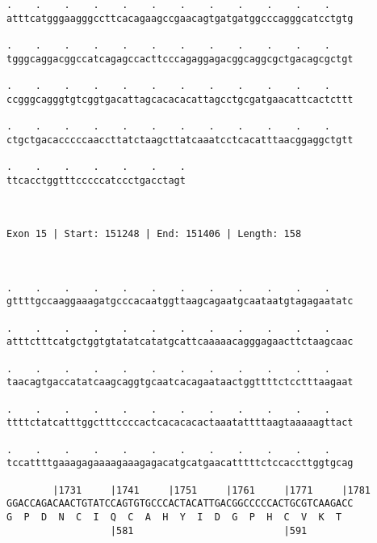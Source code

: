 \documentclass{article}
\begin{document}
\begin{Verbatim}
.    .    .    .    .    .    .    .    .    .    .    .    
atttcatgggaagggccttcacagaagccgaacagtgatgatggcccagggcatcctgtg
                                                            
.    .    .    .    .    .    .    .    .    .    .    .    
tgggcaggacggccatcagagccacttcccagaggagacggcaggcgctgacagcgctgt
                                                            
.    .    .    .    .    .    .    .    .    .    .    .    
ccgggcagggtgtcggtgacattagcacacacattagcctgcgatgaacattcactcttt
                                                            
.    .    .    .    .    .    .    .    .    .    .    .    
ctgctgacacccccaaccttatctaagcttatcaaatcctcacatttaacggaggctgtt
                                                            
.    .    .    .    .    .    .
ttcacctggtttcccccatccctgacctagt
                               
                               
 
Exon 15 | Start: 151248 | End: 151406 | Length: 158



.    .    .    .    .    .    .    .    .    .    .    .    
gttttgccaaggaaagatgcccacaatggttaagcagaatgcaataatgtagagaatatc
                                                            
.    .    .    .    .    .    .    .    .    .    .    .    
atttctttcatgctggtgtatatcatatgcattcaaaaacagggagaacttctaagcaac
                                                            
.    .    .    .    .    .    .    .    .    .    .    .    
taacagtgaccatatcaagcaggtgcaatcacagaataactggttttctcctttaagaat
                                                            
.    .    .    .    .    .    .    .    .    .    .    .    
ttttctatcatttggctttccccactcacacacactaaatattttaagtaaaaagttact
                                                            
.    .    .    .    .    .    .    .    .    .    .    .    
tccattttgaaagagaaaagaaagagacatgcatgaacatttttctccaccttggtgcag
                                                            
        |1731     |1741     |1751     |1761     |1771     |1781
GGACCAGACAACTGTATCCAGTGTGCCCACTACATTGACGGCCCCCACTGCGTCAAGACC
G  P  D  N  C  I  Q  C  A  H  Y  I  D  G  P  H  C  V  K  T  
                  |581                          |591        
  

\end{Verbatim}
\end{document}
